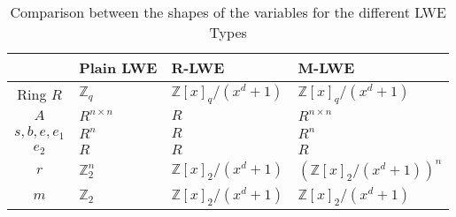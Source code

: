 \begin{table}[htbp]
  \caption[LWE variables shape comparison]{Comparison between the shapes of the variables for the different LWE Types}
  \label{table:LweDiffs}
  \centering
  \begin{tabular}{|c|l|l|l|}
    \hline
                & Plain LWE        & R-LWE                     & M-LWE                         \\
    \hline
    Ring $R$    & $\mathbb{Z}_q$   & $\mathbb{Z}[x]_q/(x^d+1)$ & $\mathbb{Z}[x]_q/(x^d+1)$     \\
    $A$         & $R^{n\times n}$  & $R$                       & $R^{n\times n}$               \\
    $s,b,e,e_1$ & $R^{n}$          & $R$                       & $R^{n}$                       \\
    $e_2$       & $R$              & $R$                       & $R$                           \\
    $r$         & $\mathbb{Z}_2^n$ & $\mathbb{Z}[x]_2/(x^d+1)$ & $(\mathbb{Z}[x]_2/(x^d+1))^n$ \\
    $m$         & $\mathbb{Z}_2$   & $\mathbb{Z}[x]_2/(x^d+1)$ & $\mathbb{Z}[x]_2/(x^d+1)$   \\
    \hline
  \end{tabular}
\end{table}

